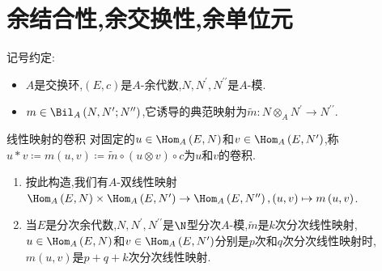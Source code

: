 \section{余结合性,余交换性,余单位元}

记号约定:
\begin{itemize}
	\item $A$是交换环,$\left(E,c\right)$是$A$-余代数,$N,N^{\prime},N^{\prime\prime}$是$A$-模.
	\item $m\in\Bil_{A}\left(N,N^{\prime};N^{\prime\prime}\right)$,它诱导的典范映射为$\tilde{m}:N\otimes_{A}N^{\prime}\to N^{\prime\prime}$.
\end{itemize}

\begin{definition}{线性映射的卷积}{}
	对固定的$u\in\Hom_{A}\left(E,N\right)$和$v\in\Hom_{A}\left(E,N^{\prime}\right)$,称$u\ast v\coloneq m\left(u,v\right)\coloneq\tilde{m}\circ\left(u\otimes v\right)\circ c$为$u$和$v$的卷积.
\end{definition}

\begin{remark}{}{}
	\begin{enumerate}
		\item 按此构造,我们有$A$-双线性映射$\Hom_{A}\left(E,N\right)\times\Hom_{A}\left(E,N^{\prime}\right)\to\Hom_{A}\left(E,N^{\prime\prime}\right),\left(u,v\right)\mapsto m\left(u,v\right)$.
		\item 当$E$是分次余代数,$N,N^{\prime},N^{\prime\prime}$是$\N$型分次$A$-模,$\tilde{m}$是$k$次分次线性映射,$u\in\Hom_{A}\left(E,N\right)$和$v\in\Hom_{A}\left(E,N^{\prime}\right)$分别是$p$次和$q$次分次线性映射时,$m\left(u,v\right)$是$p+q+k$次分次线性映射.
	\end{enumerate}
\end{remark}

